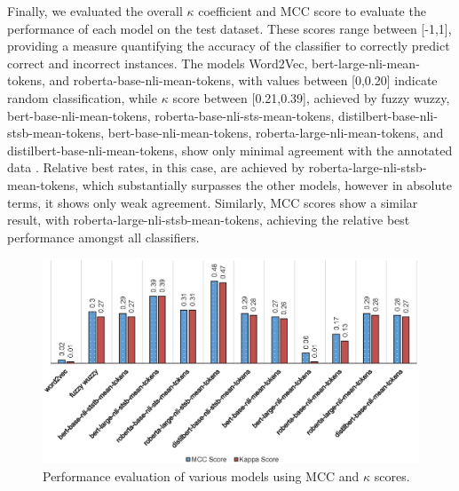 \documentclass{ieeeaccess}
\begin{document}
Finally, we evaluated the overall $\kappa$ coefficient and MCC score to evaluate the performance of each model on the test dataset. These scores range between [-1,1], providing a measure quantifying the accuracy of the classifier to correctly predict correct and incorrect instances. The models Word2Vec, bert-large-nli-mean-tokens, and roberta-base-nli-mean-tokens, with values between [0,0.20] indicate random classification, while $\kappa$ score between [0.21,0.39], achieved by fuzzy wuzzy, bert-base-nli-mean-tokens, roberta-base-nli-sts-mean-tokens, distilbert-base-nli-stsb-mean-tokens, bert-base-nli-mean-tokens, roberta-large-nli-mean-tokens, and distilbert-base-nli-mean-tokens, show only minimal agreement with the annotated data \cite{mchugh2012interrater}.  Relative best rates, in this case, are achieved by roberta-large-nli-stsb-mean-tokens, which substantially surpasses the other models, however in absolute terms, it shows only weak agreement. Similarly, MCC scores show a similar result, with roberta-large-nli-stsb-mean-tokens, achieving the relative best performance amongst all classifiers.

\begin{figure}[t!]
	\centering
	\includegraphics[scale=0.83]{evaluation}
	\caption{Performance evaluation of various models using MCC and $\kappa$ scores.}
	\label{fig:evaluation}
\end{figure}
\end{document}
